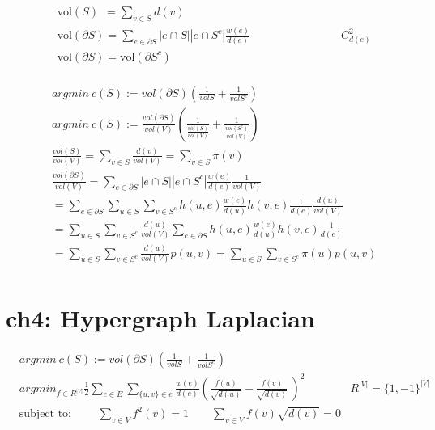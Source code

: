 \documentclass{article}
\begin{document}
%
\begin{align*}
    & \text{vol}(S) \ \ = \sum_{v \in S} d(v)  \\[3pt]
    & \text{vol}(\partial S) = \sum_{e \in \partial S} 
      |e \cap S||e \cap S^{c}| \frac{w(e)}{d(e)} 
      \qquad \qquad \qquad \qquad C_{d(e)}^{2}  \\[3pt]
    & \text{vol}(\partial S) = \text{vol}(\partial S^{c})  \\[3pt]
\end{align*}


%
\begin{align*}
    & argmin \ c(S) := vol(\partial S) (\frac{1}{volS} + \frac{1}{volS^{c}})  \\[3pt]
    & argmin \ c(S) := \frac{vol(\partial S)}{vol(V)} 
    (\frac{1}{ \frac{vol(S)}{vol(V)} } + 
     \frac{1}{ \frac{vol(S^{c})}{vol(V)} })  \\[3pt]
    & \frac{vol(S)}{vol(V)} 
      = \sum_{v \in S} \frac{d(v)}{vol(V)} 
      = \sum_{v \in S} \pi (v)  \\[3pt]
    & \frac{vol(\partial S)}{vol(V)} = \sum_{e \in \partial S} 
      |e \cap S||e \cap S^{c}| \frac{w(e)}{d (e)} 
      \frac{1}{vol(V)}  \\[3pt]
    & = \sum_{e \in \partial S} \sum_{u \in S} \sum_{v \in S^{c}} 
        h(u, e) \frac{w(e)}{d(u)} h(v, e) \frac{1}{d(e)} 
        \frac{d(u)}{vol(V)}  \\[3pt]
    & = \sum_{u \in S} \sum_{v \in S^{c}} \frac{d(u)}{vol(V)} 
        \sum_{e \in \partial S} h(u, e) \frac{w(e)}{d(u)} h(v, e) \frac{1}{d(e)}  \\[3pt]
    & = \sum_{u \in S} \sum_{v \in S^{c}} \frac{d(u)}{vol(V)} p(u, v) 
      = \sum_{u \in S} \sum_{v \in S^{c}} \pi (u) p(u, v)  \\[3pt]
\end{align*}


\newpage
\section*{ch4: Hypergraph Laplacian}


\begin{align*}
    & argmin \ c(S) := vol(\partial S) (\frac{1}{volS} + \frac{1}{volS^{c}})  \\[3pt]
    & argmin_{f \in R^{|V|}} \frac{1}{2} 
      \sum_{e \in E} \sum_{\{u, v\} \in e} 
      \frac{w(e)}{d(e)} 
      \left( \frac{f(u)}{\sqrt{d(u)}} - \frac{f(v)}{\sqrt{d(v)}}\ \right)^2 \qquad \qquad 
      R^{|V|} = \{1, -1\}^{|V|}  \\[3pt]
    & \text{subject to: } \qquad 
      \sum_{v \in V} f^2(v)=1 \qquad 
      \sum_{v \in V} f(v) \sqrt{d(v)} = 0  \\[3pt]
\end{align*}
\end{document}
